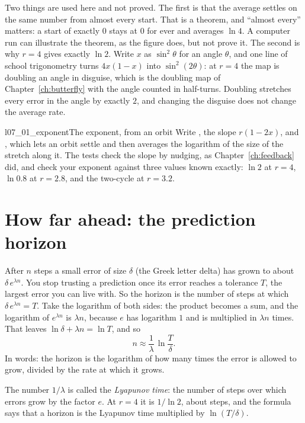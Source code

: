 \begin{rigourbox}
Two things are used here and not proved. The first is that the average
settles on the same number from almost every start. That is a theorem, and
\enquote{almost every} matters: a start of exactly $0$ stays at $0$ for ever
and averages $\ln 4$. A computer run can illustrate the theorem, as the
figure does, but not prove it. The second is why $r = 4$
gives exactly $\ln 2$. Write $x$ as $\sin^{2}\theta$ for an angle $\theta$,
and one line of school trigonometry turns $4x(1 - x)$ into
$\sin^{2}(2\theta)$: at $r = 4$ the map is doubling an angle in disguise,
which is the doubling map of Chapter~\ref{ch:butterfly} with the angle
counted in half-turns. Doubling stretches every error in the angle by exactly
$2$, and changing the disguise does not change the average rate.
\end{rigourbox}

\begin{lab}{l07_01_exponent}{The exponent, from an orbit}
Write , the slope $r(1 - 2x)$, and , which lets
an orbit settle and then averages the logarithm of the size of the stretch
along it. The tests check the slope by nudging, as Chapter~\ref{ch:feedback}
did, and check your exponent against three values known exactly: $\ln 2$ at
$r = 4$, $\ln\num{0.8}$ at $r = \num{2.8}$, and the two-cycle at
$r = \num{3.2}$.
\end{lab}

\section{How far ahead: the prediction horizon}
\label{sec:ch07-horizon}

\noindent
After $n$ steps a small error of size $\delta$
(the Greek letter delta) has grown to about $\delta\, e^{\lambda n}$. You
stop trusting a prediction once its error reaches a tolerance $T$, the
largest error you can live with. So the horizon is the number of steps at
which $\delta\, e^{\lambda n} = T$. Take the logarithm of both sides: the
product becomes a sum, and the logarithm of $e^{\lambda n}$ is $\lambda n$,
because $e$ has logarithm $1$ and is multiplied in $\lambda n$ times. That
leaves $\ln\delta + \lambda n = \ln T$, and so
\[ n \approx \frac{1}{\lambda}\,\ln\frac{T}{\delta}. \]
In words: the horizon is the logarithm of how many times the error is
allowed to grow, divided by the rate at which it grows.

The number $1/\lambda$ is called the \emph{Lyapunov time}:
the number of steps over which errors grow by the factor $e$. At $r = 4$ it
is $1/\ln 2$, about  steps, and the formula says that a
horizon is the Lyapunov time multiplied by $\ln(T/\delta)$.

